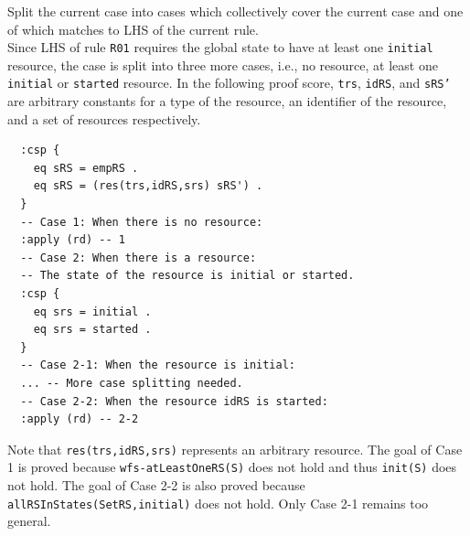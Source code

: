 \documentclass[12pt]{report}
\newcommand{\stt}[1]{{\small{\tt {#1}}}}
\begin{document}
 Split the current case into cases which
collectively cover the current case and one of which matches to LHS of
the current rule. \\ Since LHS of rule {\tt R01} requires the global
state to have at least one {\tt initial} resource, the case is split
into three more cases, i.e., no resource, at least one {\tt initial}
or {\tt started} resource. In the following proof score, {\tt trs},
{\tt idRS}, and {\tt sRS'} are arbitrary constants for a type of the
resource, an identifier of the resource, and a set of resources
respectively.
\small
\begin{verbatim}
  :csp { 
    eq sRS = empRS .
    eq sRS = (res(trs,idRS,srs) sRS') .
  }
  -- Case 1: When there is no resource:
  :apply (rd) -- 1
  -- Case 2: When there is a resource:
  -- The state of the resource is initial or started.
  :csp { 
    eq srs = initial .
    eq srs = started .
  }
  -- Case 2-1: When the resource is initial:
  ... -- More case splitting needed.
  -- Case 2-2: When the resource idRS is started:
  :apply (rd) -- 2-2
\end{verbatim}
\normalsize
Note that \stt{res(trs,idRS,srs)} represents an arbitrary resource.
The goal of Case 1 is proved because \stt{wfs-atLeastOneRS(S)} does
not hold and thus \stt{init(S)} does not hold. The goal of Case 2-2 is
also proved because \stt{allRSInStates(SetRS,initial)} does not hold.
Only Case 2-1 remains too general.\\
\end{document}
